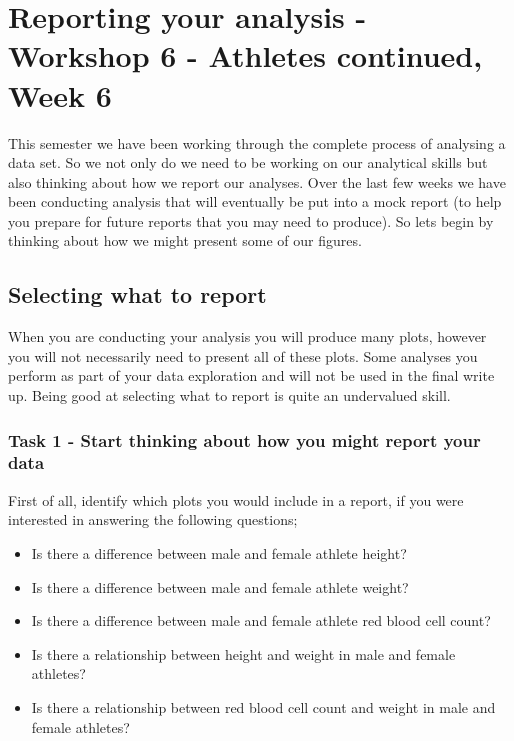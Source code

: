 \documentclass[
]{book}
\providecommand{\tightlist}{%
  \setlength{\itemsep}{0pt}\setlength{\parskip}{0pt}}
\begin{document}
\chapter{Reporting your analysis - Workshop 6 - Athletes continued, Week 6}\label{reporting}

This semester we have been working through the complete process of analysing a data set. So we not only do we need to be working on our analytical skills but also thinking about how we report our analyses. Over the last few weeks we have been conducting analysis that will eventually be put into a mock report (to help you prepare for future reports that you may need to produce). So lets begin by thinking about how we might present some of our figures.

\section{Selecting what to report}\label{selecting-what-to-report}

When you are conducting your analysis you will produce many plots, however you will not necessarily need to present all of these plots. Some analyses you perform as part of your data exploration and will not be used in the final write up. Being good at selecting what to report is quite an undervalued skill.

\subsection{Task 1 - Start thinking about how you might report your data}\label{task-1---start-thinking-about-how-you-might-report-your-data}

First of all, identify which plots you would include in a report, if you were interested in answering the following questions;

\begin{itemize}
\tightlist
\item
  Is there a difference between male and female athlete height?
\item
  Is there a difference between male and female athlete weight?
\item
  Is there a difference between male and female athlete red blood cell count?
\item
  Is there a relationship between height and weight in male and female athletes?
\item
  Is there a relationship between red blood cell count and weight in male and female athletes?
\end{itemize}
\end{document}
